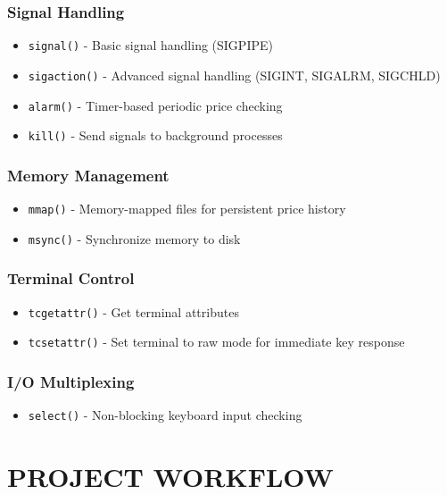 \documentclass[12pt,a4paper]{article}
\begin{document}
\subsubsection{Signal Handling}
\begin{itemize}[itemsep=0.3em]
    \item \texttt{signal()} - Basic signal handling (SIGPIPE)
    \item \texttt{sigaction()} - Advanced signal handling (SIGINT, SIGALRM, SIGCHLD)
    \item \texttt{alarm()} - Timer-based periodic price checking
    \item \texttt{kill()} - Send signals to background processes
\end{itemize}

\subsubsection{Memory Management}
\begin{itemize}[itemsep=0.3em]
    \item \texttt{mmap()} - Memory-mapped files for persistent price history
    \item \texttt{msync()} - Synchronize memory to disk
\end{itemize}

\subsubsection{Terminal Control}
\begin{itemize}[itemsep=0.3em]
    \item \texttt{tcgetattr()} - Get terminal attributes
    \item \texttt{tcsetattr()} - Set terminal to raw mode for immediate key response
\end{itemize}

\subsubsection{I/O Multiplexing}
\begin{itemize}[itemsep=0.3em]
    \item \texttt{select()} - Non-blocking keyboard input checking
\end{itemize}

\newpage

\section{PROJECT WORKFLOW}
\end{document}

